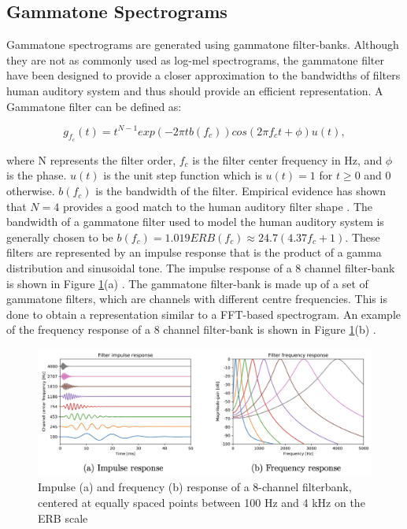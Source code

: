 \subsection{Gammatone Spectrograms}
Gammatone spectrograms \cite{gammatone} are generated using gammatone filter-banks. Although they are not as commonly used as log-mel spectrograms, the gammatone filter have been designed to provide a closer approximation to the bandwidths of filters human auditory system \cite{slaney} and thus should provide an efficient representation. A Gammatone filter can be defined as:

\begin{equation}
g_{f_c}(t) = t^{N-1}exp(−2{\pi}tb(f_c)) cos(2πf_ct + {\phi})u(t),  
\end{equation}

where N represents the filter order, \(f_c\) is the filter center frequency in Hz, and \(\phi\) is the phase. \(u(t)\) is the unit step function which is \(u(t) = 1\) for \(t \geqslant 0\) and 0 otherwise. \(b(f_c)\) is the bandwidth of the filter. Empirical evidence has shown that \(N = 4\) provides a good match to the human auditory filter shape \cite{deliang}. The bandwidth of a gammatone filter used to model the human auditory system is generally chosen to be \(b(f_c) = 1.019 ERB(f_c) \approx 24.7(4.37f_c + 1)\). These filters are represented by an impulse response that is the product of a gamma distribution and sinusoidal tone. The impulse response of a 8 channel filter-bank is shown in Figure \ref{fig:impulse-frequency}(a) \cite{abdulla-gammatone}. The gammatone filter-bank is made up of a set of gammatone filters, which are channels with different centre frequencies. This is done to obtain a representation similar to a FFT-based spectrogram. An example of the frequency response of a 8 channel filter-bank is shown in Figure \ref{fig:impulse-frequency}(b) \cite{abdulla-gammatone}.\\

\begin{figure}[!htp]
    \centering
    \includegraphics[width=\textwidth]{fig/impulse_frequency.png}
    \caption{Impulse (a) and frequency (b) response of a 8-channel filterbank, centered at equally spaced points between 100 Hz and 4 kHz
on the ERB scale}
    \label{fig:impulse-frequency}
\end{figure}

